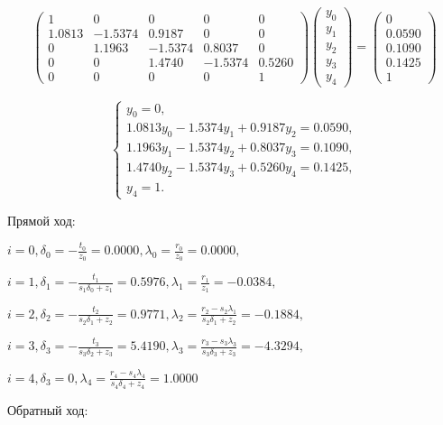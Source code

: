 \documentclass{article}
\begin{document}
	$$ 
	\left(\begin{array}{ccccc} 
		1 & 0 & 0 & 0 & 0 \\ 
		1.0813 & -1.5374 & 0.9187 & 0 & 0 \\ 
		0 & 1.1963 & -1.5374 & 0.8037 & 0 \\ 
		0 & 0 & 1.4740 & -1.5374 & 0.5260\\
		0 & 0 & 0 & 0 & 1
	\end{array}\right) 
	\left(\begin{array}{c} 
		y_0\\ 
		y_1\\ 
		y_2\\
		y_3\\
		y_4 
	\end{array}\right)
	=
	 \left(\begin{array}{c} 
	 	0\\ 
	 	0.0590\\ 
	 	0.1090\\
	 	0.1425\\
	 	1 
	 \end{array}\right)
	$$
	
	\begin{equation*}
		\begin{cases}
			y_0 = 0, 
			\\
			1.0813y_0 - 1.5374y_1  + 0.9187y_2 = 0.0590,
			\\
			1.1963y_1 - 1.5374y_2  + 0.8037y_3 = 0.1090,
			\\
			1.4740y_2 -1.5374y_3  + 0.5260y_4 = 0.1425,
			\\
			y_4 = 1.
		\end{cases}
	\end{equation*}

	Прямой ход:
	
	$i = 0, \delta_0 = -\frac{t_0}{z_0} = 0.0000, \lambda_0 = \frac{r_0}{z_0} = 0.0000,$
	
	$i = 1, \delta_1 = -\frac{t_1}{s_1\delta_{0}+z_1} = 0.5976, \lambda_1 = \frac{r_1}{z_1} = -0.0384,$
	
	$i = 2, \delta_2 = -\frac{t_2}{s_2\delta_{1}+z_2} = 0.9771, \lambda_2 = \frac{r_2-s_2\lambda_{1}}{s_2\delta_{1}+ z_2} = -0.1884,$
	
	$i = 3, \delta_3 = -\frac{t_3}{s_3\delta_{2}+z_3} = 5.4190, \lambda_3 = \frac{r_3-s_3\lambda_{3}}{s_3\delta_{3}+ z_3} =-4.3294,$
	
	$i = 4, \delta_3 = 0, \lambda_4 = \frac{r_4-s_4\lambda_{4}}{s_4\delta_{4}+ z_4} = 1.0000$
	
	Обратный ход:
	
\end{document}

